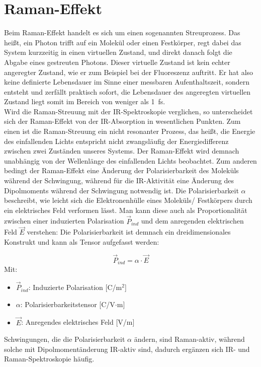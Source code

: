 \section{Raman-Effekt}\label{sec:raman}
Beim Raman-Effekt handelt es sich um einen sogenannten Streuprozess. Das heißt, ein Photon trifft auf ein Molekül oder einen Festkörper, regt 
dabei das System kurzzeitig in einen virtuellen Zustand, und direkt danach folgt die Abgabe eines gestreuten Photons. Dieser virtuelle Zustand 
ist kein \glqq{}echter\grqq{} angeregter Zustand, wie er zum Beispiel bei der Fluoreszenz auftritt. Er hat also keine definierte Lebensdauer 
im Sinne einer messbaren Aufenthaltszeit, sondern entsteht und zerfällt praktisch sofort, die Lebensdauer des angeregten virtuellen Zustand 
liegt somit im Bereich von weniger als 1~fs.\\
Wird die Raman-Streuung mit der IR-Spektroskopie verglichen, so unterscheidet sich der Raman-Effekt von der IR-Absorption in wesentlichen Punkten.
Zum einen ist die Raman-Streuung ein nicht resonanter Prozess, das heißt, die Energie des einfallenden Lichts entspricht nicht zwangsläufig der Energiedifferenz zwischen 
zwei Zuständen unseres Systems. Der Raman-Effekt wird demnach unabhängig von der Wellenlänge des einfallenden Lichts beobachtet.
Zum anderen bedingt der Raman-Effekt eine Änderung der Polarisierbarkeit des Moleküls während der Schwingung, während für
die IR-Aktivität eine Änderung des Dipolmoments während der Schwingung notwendig ist. Die Polarisierbarkeit $\alpha$ beschreibt, 
wie leicht sich die Elektronenhülle eines Moleküls/ Festkörpers durch ein elektrisches Feld verformen lässt.
Man kann diese auch als Proportionalität zwischen einer induzierten Polarisation $\vec{P}_{ind}$ und dem anregenden elektrischen Feld $\vec{E}$ verstehen:
Die Polarisierbarkeit ist demnach ein dreidimensionales Konstrukt und kann als Tensor aufgefasst werden:

\begin{equation}
    \vec{P}_{ind} = \alpha \cdot \vec{E}
\end{equation}
Mit:
\begin{itemize}
    \item $\vec{P}_{ind}$: Induzierte Polarisation [C/m$^2$]
    \item $\alpha$: Polarisierbarkeitstensor [C/V$\cdot$m]
    \item $\vec{E}$: Anregendes elektrisches Feld [V/m]
\end{itemize}

Schwingungen, die die Polarisierbarkeit $\alpha$ ändern, sind 
Raman-aktiv, während solche mit Dipolmomentänderung IR-aktiv sind, dadurch ergänzen sich IR- und Raman-Spektroskopie häufig.\\

